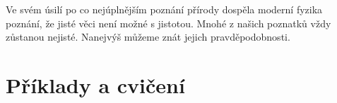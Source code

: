     Ve svém úsilí po co nejúplnějším poznání přírody dospěla moderní fyzika poznání, že jisté věci 
    není možné  s jistotou. Mnohé z našich poznatků vždy zůstanou nejisté. Nanejvýš 
    můžeme znát jejich pravděpodobnosti. 
    
  \section{Příklady a cvičení}
  
